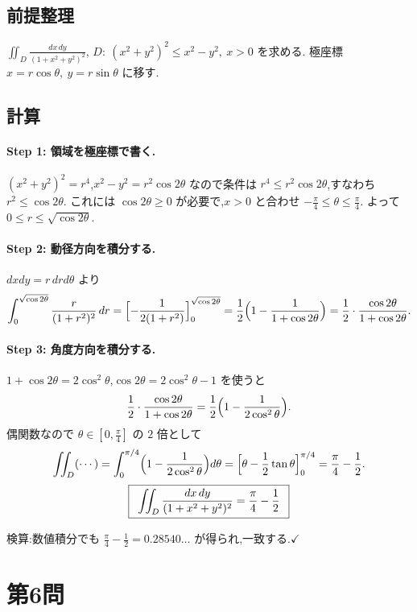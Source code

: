 \documentclass[11pt,a4paper]{article}
\begin{document}
\subsection*{前提整理}

$\displaystyle\iint_D\frac{dx\,dy}{(1+x^2+y^2)^2}$,
$D:\ (x^2+y^2)^2\le x^2-y^2,\ x>0$ を求める.
極座標 $x=r\cos\theta,\ y=r\sin\theta$ に移す.

\subsection*{計算}

\paragraph{Step 1: 領域を極座標で書く.}
$(x^2+y^2)^2=r^4$,$x^2-y^2=r^2\cos2\theta$ なので条件は
$r^4\le r^2\cos2\theta$,すなわち $r^2\le\cos2\theta$.
これには $\cos2\theta\ge0$ が必要で,$x>0$ と合わせ $-\tfrac\pi4\le\theta\le\tfrac\pi4$.
よって $0\le r\le\sqrt{\cos2\theta}$.

\paragraph{Step 2: 動径方向を積分する.}
$dxdy=r\,drd\theta$ より
\[
\int_0^{\sqrt{\cos2\theta}}\frac{r}{(1+r^2)^2}\,dr
=\Bigl[-\frac{1}{2(1+r^2)}\Bigr]_0^{\sqrt{\cos2\theta}}
=\frac12\Bigl(1-\frac{1}{1+\cos2\theta}\Bigr)
=\frac12\cdot\frac{\cos2\theta}{1+\cos2\theta}.
\]

\paragraph{Step 3: 角度方向を積分する.}
$1+\cos2\theta=2\cos^2\theta$,$\cos2\theta=2\cos^2\theta-1$ を使うと
\[
\frac12\cdot\frac{\cos2\theta}{1+\cos2\theta}
=\frac12\Bigl(1-\frac{1}{2\cos^2\theta}\Bigr).
\]
偶関数なので $\theta\in[0,\tfrac\pi4]$ の $2$ 倍として
\[
\iint_D(\cdots)
=\int_0^{\pi/4}\Bigl(1-\frac{1}{2\cos^2\theta}\Bigr)d\theta
=\Bigl[\theta-\frac12\tan\theta\Bigr]_0^{\pi/4}
=\frac\pi4-\frac12.
\]
\[
\ans{\
\iint_D\frac{dx\,dy}{(1+x^2+y^2)^2}=\frac{\pi}{4}-\frac12\ }
\]

検算:数値積分でも $\frac\pi4-\frac12=0.28540\ldots$ が得られ,一致する.$\checkmark$

\section*{第6問}
\end{document}
